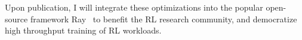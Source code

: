 \documentclass[letterpaper,11pt]{article}
\begin{document}
\noindent
Upon publication, I will integrate these optimizations into the popular open-source framework Ray~\cite{ray} to benefit the RL research community, and democratize high throughput training of RL workloads.


%
%
\end{document}

